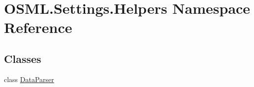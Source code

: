 \hypertarget{namespaceOSML_1_1Settings_1_1Helpers}{}\section{O\+S\+M\+L.\+Settings.\+Helpers Namespace Reference}
\label{namespaceOSML_1_1Settings_1_1Helpers}
\subsection*{Classes}
\begin{DoxyCompactItemize}
\item 
class \mbox{\hyperlink{classOSML_1_1Settings_1_1Helpers_1_1DataParser}{Data\+Parser}}
\end{DoxyCompactItemize}
